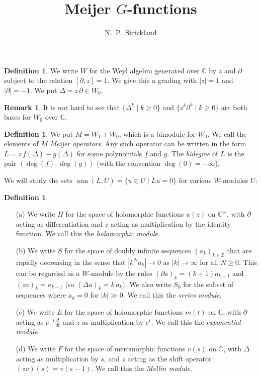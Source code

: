 \documentclass{amsart}
\newcommand{\ann}       {\operatorname{ann}}
\newcommand{\Z}         {{\mathbb{Z}}}
\newcommand{\C}         {{\mathbb{C}}}
\newcommand{\Dl}        {\Delta}
\newcommand{\st}        {\;|\;}
\newcommand{\tm}        {\times}
\renewcommand{\:}{\colon}
\theoremstyle{definition}
\newtheorem{remark}[theorem]{Remark}
\newtheorem{definition}[theorem]{Definition}
\begin{document}
\title{Meijer $G$-functions}
\author{N.~P.~Strickland}

\maketitle 

\begin{definition}
 We write $W$ for the Weyl algebra generated over $\C$ by $z$ and
 $\partial$ subject to the relation $[\partial,z]=1$.  We give this a
 grading with $|z|=1$ and $|\partial|=-1$.  We put
 $\Dl=z\,\partial\in W_0$. 
\end{definition}

\begin{remark}
 It is not hard to see that $\{\Dl^k\st k\geq 0\}$ and
 $\{z^k\partial^k\st k\geq 0\}$ are both bases for $W_0$ over $\C$.
\end{remark}

\begin{definition}
 We put $M=W_1+W_0$, which is a bimodule for $W_0$.  We call the
 elements of $M$ \emph{Meijer operators}.  Any such operator can be
 written in the form $L=z\,f(\Dl)-g(\Dl)$ for some polynomials $f$ and
 $g$.  The \emph{bidegree} of $L$ is the pair $(\deg(f),\deg(g))$
 (with the convention $\deg(0)=-\infty$). 
\end{definition}

We will study the sets $\ann(L,U)=\{u\in U\st Lu=0\}$ for various
$W$-modules $U$:
\begin{definition}\leavevmode
 \begin{itemize}
  \item[(a)] We write $H$ for the space of holomorphic functions
   $u(z)$ on $\C^\tm$, with $\partial$ acting as differentiation and
   $z$ acting as multiplication by the identity function.  We call
   this the \emph{holomorphic module}.
  \item[(b)] We write $S$ for the space of doubly infinite sequences
   $(a_k)_{k\in\Z}$ that are rapidly decreasing in the sense that 
   $|k^Na_k|\to 0$ as $|k|\to\infty$ for all $N\geq 0$.  This can be
   regarded as a $W$-module by the rules $(\partial a)_k=(k+1)a_{k+1}$
   and $(za)_k=a_{k-1}$ (so $(\Dl a)_k=k\,a_k$).  We also write $S_0$
   for the subset of sequences where $a_k=0$ for $|k|\gg 0$.  We call
   this the \emph{series module}.
  \item[(c)] We write $E$ for the space of holomorphic functions
   $m(t)$ on $\C$, with $\partial$ acting as $e^{-t}\frac{d}{dt}$ and
   $z$ as multiplication by $e^t$.  We call this the \emph{exponential
   module}.
  \item[(d)] We write $F$ for the space of meromorphic functions
   $v(s)$ on $\C$, with $\Dl$ acting as multiplication by $s$,
   and $z$ acting as the shift operator $(zv)(s)=v(s-1)$.  We call
   this the \emph{Mellin module}.
 \end{itemize}
\end{definition}
\end{document}
